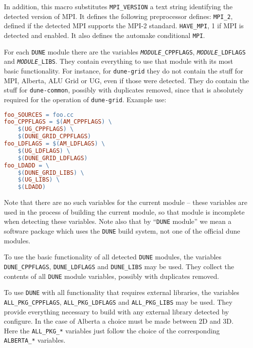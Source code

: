 \documentclass[11pt,a4paper,headinclude,footinclude,DIV16,normalheadings]{scrartcl}
\newcommand{\dune}{\texttt{DUNE}\xspace}
\begin{document}
\begin{description}
  In addition, this macro substitutes \texttt{MPI\_VERSION} a text string
  identifying the detected version of MPI.  It defines the following
  preprocessor defines: \texttt{MPI\_2}, defined if the detected MPI supports
  the MPI-2 standard.  \texttt{HAVE\_MPI}, 1 if MPI is detected and enabled.
  It also defines the automake conditional \texttt{MPI}.
\item[\dune modules] For each \dune module there are the variables
  \texttt{\textit{MODULE}\_CPPFLAGS}, \texttt{\textit{MODULE}\_LDFLAGS} and
  \texttt{\textit{MODULE}\_LIBS}.  They contain everything to use that module
  with its most basic functionality.  For instance, for \texttt{dune-grid}
  they do not contain the stuff for MPI, Alberta, ALU Grid or UG, even if
  those were detected.  They do contain the stuff for \texttt{dune-common},
  possibly with duplicates removed, since that is absolutely required for the
  operation of \texttt{dune-grid}.  Example use:
  \begin{lstlisting}[language=make]
foo_SOURCES = foo.cc
foo_CPPFLAGS = $(AM_CPPFLAGS) \
	$(UG_CPPFLAGS) \
	$(DUNE_GRID_CPPFLAGS)
foo_LDFLAGS = $(AM_LDFLAGS) \
	$(UG_LDFLAGS) \
	$(DUNE_GRID_LDFLAGS)
foo_LDADD = \
	$(DUNE_GRID_LIBS) \
	$(UG_LIBS) \
	$(LDADD)
  \end{lstlisting}
  Note that there are no such variables for the current module -- these
  variables are used in the process of building the current module, so that
  module is incomplete when detecting these variables.  Note also that by
  ``\dune module'' we mean a software package which uses the \dune
  build system, not one of the official dune modules.
\item[Basic \dune] To use the basic functionality of all detected \dune
  modules, the variables \texttt{DUNE\_CPPFLAGS}, \texttt{DUNE\_LDFLAGS} and
  \texttt{DUNE\_LIBS} may be used.  They collect the contents of all \dune
  module variables, possibly with duplicates removed.
\item[Extended \dune] To use \dune with all functionality that requires
  external libraries, the variables \texttt{ALL\_PKG\_CPPFLAGS},
  \texttt{ALL\_PKG\_LDFLAGS} and \texttt{ALL\_PKG\_LIBS} may be used.  They
  provide everything necessary to build with any external library detected by
  configure.  In the case of Alberta a choice must be made between 2D and 3D.
  Here the \texttt{ALL\_PKG\_*} variables just follow the choice of the
  corresponding \texttt{ALBERTA\_*} variables.
\end{description}
\end{document}
